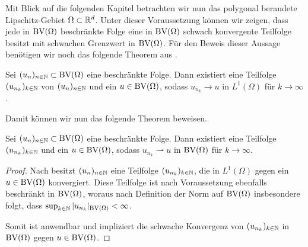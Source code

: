 Mit Blick auf die folgenden Kapitel betrachten wir nun
das polygonal berandete Lip\-schitz-Gebiet $\Omega\subset\mathbb{R}^d$. 
Unter dieser Voraussetzung können wir zeigen, dass jede in $\textup{BV}(\Omega)$
beschränkte Folge eine in $\textup{BV}(\Omega)$ schwach konvergente Teilfolge besitzt
mit schwachen Grenzwert in $\textup{BV}(\Omega)$. Für den Beweis dieser Aussage 
benötigen wir noch das folgende Theorem aus \cite[S. 176, Theorem 4]{EG92}.

\begin{theorem}
  \label{thm:l1ConvergentSubsequence}
  Sei $(u_n)_{n\in\mathbb{N}}\subset \textup{BV}(\Omega)$ eine beschränkte Folge. Dann 
  existiert eine Teilfolge $(u_{n_k})_{k\in\mathbb{N}}$ von
  $(u_n)_{n\in\mathbb{N}}$ und ein $u\in\textup{BV}(\Omega)$, sodass
  $u_{n_k}\to u$ in $L^1(\Omega)$ für $k\to \infty$.
\end{theorem}

Damit können wir nun das folgende Theorem beweisen.
\begin{theorem}
  \label{thm:compactness}
  Sei $(u_n)_{n\in\mathbb{N}}\subset \textup{BV}(\Omega)$ eine beschränkte Folge. Dann 
  existiert eine Teilfolge $(u_{n_k})_{k\in\mathbb{N}}$ und ein $u\in\textup{BV}(\Omega)$,
  sodass $u_{n_k}\rightharpoonup u$ in $\textup{BV}(\Omega)$ für $k\rightarrow\infty$.
\end{theorem}

\begin{proof}
  Nach  besitzt $(u_n)_{n\in\mathbb{N}}$ eine
  Teilfolge $(u_{n_k})_{k\in\mathbb{N}}$, die in $L^1(\Omega)$ gegen ein
  $u\in\textup{BV}(\Omega)$ konvergiert.
  Diese Teilfolge ist nach Voraussetzung ebenfalls beschränkt in 
  $\textup{BV}(\Omega)$, woraus nach Definition der Norm auf $\textup{BV}(\Omega)$ insbesondere
  folgt, dass
  $\sup_{k\in\mathbb{N}}|u_{n_k}|_{\textup{BV}(\Omega)}< \infty$. 
  
  Somit ist  anwendbar und impliziert die schwache Konvergenz von
  $(u_{n_k})_{k\in\mathbb{N}}$ in $\textup{BV}(\Omega)$ gegen $u\in\textup{BV}(\Omega)$.
\end{proof}
